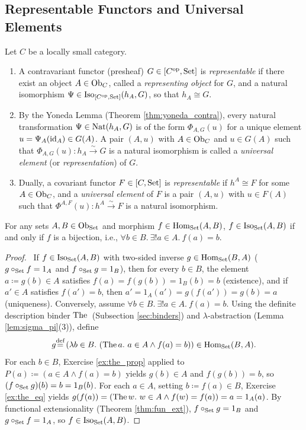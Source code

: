 \documentclass[10pt,a4paper]{article}
\renewcommand{\myprf}{\begin{proof}}
\renewcommand{\myqed}{\end{proof}}
\begin{document}
\subsection{Representable Functors and Universal Elements}\label{sec:rep_functors}
\begin{definition}\label{def:representable}
Let $C$ be a locally small category.
\begin{enumerate}
\item A contravariant functor (presheaf) $G \in [C^{\textrm{op}}, {\textrm{Set}}]$ is \emph{representable} if there exist an object $A \in {\textrm{Ob}}_C$, called a \emph{representing object} for $G$, and a natural isomorphism $\Psi \in {\mathrm{Iso}}_{[C^{\textrm{op}}, {\textrm{Set}}]}(h_A, G)$, so that $h_A \cong G$.
\item By the Yoneda Lemma (Theorem \ref{thm:yoneda_contra}), every natural transformation $\Psi \in {\textrm{Nat}}(h_A, G)$ is of the form $\Phi_{A,G}(u)$ for a unique element $u = \Psi_A({\textrm{id}}_A) \in G(A)$. A pair $(A, u)$ with $A \in {\textrm{Ob}}_C$ and $u \in G(A)$ such that $\Phi_{A,G}(u) : h_A \xrightarrow{\sim} G$ is a natural isomorphism is called a \emph{universal element} (or \emph{representation}) of $G$.
\item Dually, a covariant functor $F \in [C, {\textrm{Set}}]$ is \emph{representable} if $h^A \cong F$ for some $A \in {\textrm{Ob}}_C$, and a \emph{universal element} of $F$ is a pair $(A, u)$ with $u \in F(A)$ such that $\Phi^{A,F}(u) : h^A \xrightarrow{\sim} F$ is a natural isomorphism.
\end{enumerate}
\end{definition}

\begin{lemma}\label{lem:set_iso_bij}
For any sets $A, B \in {\textrm{Ob}}_{\textrm{Set}}$ and morphism $f \in {\textrm{Hom}}_{\textrm{Set}}(A, B)$, $f \in {\mathrm{Iso}}_{\textrm{Set}}(A, B)$ if and only if $f$ is a bijection, i.e., $\forall b \in B.\ \exists !a \in A.\ f(a) = b$.
\end{lemma}
\myprf\ If $f \in {\mathrm{Iso}}_{\textrm{Set}}(A, B)$ with two-sided inverse $g \in {\textrm{Hom}}_{\textrm{Set}}(B, A)$ ($g \circ_{\textrm{Set}} f = 1_A$ and $f \circ_{\textrm{Set}} g = 1_B$), then for every $b \in B$, the element $a \coloneqq g(b) \in A$ satisfies $f(a) = f(g(b)) = 1_B(b) = b$ (existence), and if $a' \in A$ satisfies $f(a') = b$, then $a' = 1_A(a') = g(f(a')) = g(b) = a$ (uniqueness). Conversely, assume $\forall b \in B.\ \exists !a \in A.\ f(a) = b$. Using the definite description binder ${\textrm{The\,}}$ (Subsection \ref{sec:binders}) and $\lambda$-abstraction (Lemma \ref{lem:sigma_pi}(3)), define
$$g {\stackrel{{\textrm{def}}}{=}} \left(\lambda b \in B.\ ({\textrm{The\,}} a.\ a \in A \land f(a) = b)\right) \in {\textrm{Hom}}_{\textrm{Set}}(B, A).$$
For each $b \in B$, Exercise \ref{ex:the_prop} applied to $P(a) \coloneqq (a \in A \land f(a) = b)$ yields $g(b) \in A$ and $f(g(b)) = b$, so $(f \circ_{\textrm{Set}} g)(b) = b = 1_B(b)$. For each $a \in A$, setting $b \coloneqq f(a) \in B$, Exercise \ref{ex:the_eq} yields $g(f(a)) = ({\textrm{The\,}} w.\ w \in A \land f(w) = f(a)) = a = 1_A(a)$. By functional extensionality (Theorem \ref{thm:fun_ext}), $f \circ_{\textrm{Set}} g = 1_B$ and $g \circ_{\textrm{Set}} f = 1_A$, so $f \in {\mathrm{Iso}}_{\textrm{Set}}(A, B)$. \myqed
\end{document}
